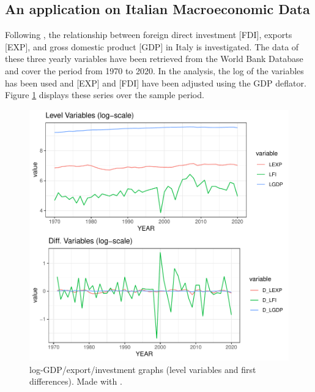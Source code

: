 \subsection{An application on Italian Macroeconomic Data}
Following \citet{bertelli2022bootstrap}, the relationship between foreign direct investment [FDI], exports [EXP], and gross domestic product [GDP] in Italy is investigated.
The data of these three yearly variables have been retrieved from the World Bank Database and cover the period from 1970 to 2020. In the analysis, the log of the variables has been used and [EXP] and [FDI] have been adjusted using the GDP deflator. Figure \ref{fig:plotemp2} displays these series over the sample period.

\begin{center}
\begin{figure}[htbp!]
        \centering
        \includegraphics[scale=0.7]{figures/tsgraph2.pdf}
        \caption{log-GDP/export/investment graphs (level variables and first differences). Made with .}
        \label{fig:plotemp2}
\end{figure}
\end{center}


